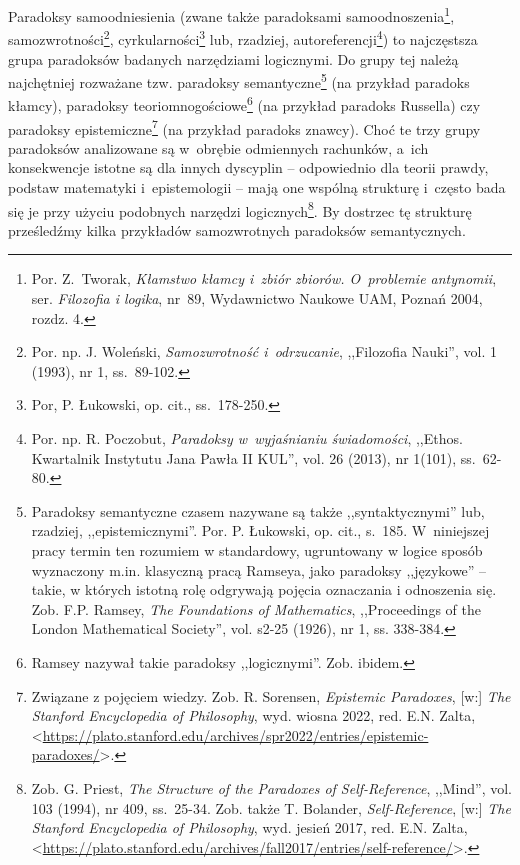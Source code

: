 Paradoksy samoodniesienia (zwane także paradoksami samoodnoszenia\footnote{Por. Z.~Tworak, \textit{Kłamstwo kłamcy i~zbiór zbiorów. O~problemie antynomii}, ser. \textit{Filozofia i logika}, nr~89, Wydawnictwo Naukowe UAM, Poznań 2004, rozdz. 4.}, samozwrotności\footnote{Por. np. J. Woleński, \textit{Samozwrotność i~odrzucanie}, ,,Filozofia Nauki'', vol. 1 (1993), nr 1, ss.~89-102.}, cyrkularności\footnote{Por, P. Łukowski, op. cit., ss.~178-250.} lub, rzadziej, autoreferencji\footnote{Por. np. R. Poczobut, \textit{Paradoksy w~wyjaśnianiu świadomości}, ,,Ethos. Kwartalnik Instytutu Jana Pawła II KUL'', vol. 26 (2013), nr 1(101), ss.~62-80.}) to najczęstsza grupa paradoksów badanych narzędziami logicznymi. Do grupy tej należą najchętniej rozważane tzw. paradoksy semantyczne\footnote{Paradoksy semantyczne czasem nazywane są także ,,syntaktycznymi'' lub, rzadziej, ,,epistemicznymi''. Por. P. Łukowski, op. cit., s.~185. W~niniejszej pracy termin ten rozumiem w standardowy, ugruntowany w logice sposób wyznaczony m.in. klasyczną pracą Ramseya, jako paradoksy ,,językowe'' -- takie, w których istotną rolę odgrywają pojęcia oznaczania i odnoszenia się. Zob. F.P. Ramsey, \textit{The Foundations of Mathematics}, ,,Proceedings of the London Mathematical Society'', vol. s2-25 (1926), nr 1, ss. 338-384.} (na przykład paradoks kłamcy), paradoksy teoriomnogościowe\footnote{Ramsey nazywał takie paradoksy ,,logicznymi''. Zob. ibidem.} (na przykład paradoks Russella) czy paradoksy epistemiczne\footnote{Związane z pojęciem wiedzy. Zob. R. Sorensen, \textit{Epistemic Paradoxes}, [w:] \textit{The Stanford Encyclopedia of Philosophy}, wyd. wiosna 2022, red. E.N. Zalta, <\url{https://plato.stanford.edu/archives/spr2022/entries/epistemic-paradoxes/}>.} (na przykład paradoks znawcy). Choć te trzy grupy paradoksów analizowane są w~obrębie odmiennych rachunków, a~ich konsekwencje istotne są dla innych dyscyplin -- odpowiednio dla teorii prawdy, podstaw matematyki i~epistemologii -- mają one wspólną strukturę i~często bada się je przy użyciu podobnych narzędzi logicznych\footnote{Zob. G. Priest, \textit{The Structure of the Paradoxes of Self-Reference}, ,,Mind'', vol. 103 (1994), nr 409, ss.~25-34. Zob. także T. Bolander, \textit{Self-Reference}, [w:] \textit{The Stanford Encyclopedia of Philosophy}, wyd. jesień 2017, red. E.N. Zalta, {\textless}\url{https://plato.stanford.edu/archives/fall2017/entries/self-reference/}{\textgreater}.}. By dostrzec tę strukturę prześledźmy kilka przykładów samozwrotnych paradoksów semantycznych.

